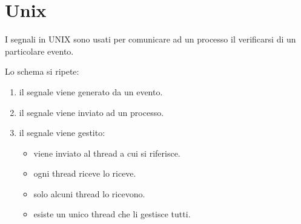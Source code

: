 \begin{figure}[H]
    \centering 
    \qquad
%
    \qquad
%
    \qquad
%
%
    \caption{ }
  \end{figure}

\section{Unix}
I segnali in UNIX sono usati per comunicare ad un processo il verificarsi di un particolare evento. 

Lo schema si ripete:
\begin{enumerate}
  \item il segnale viene generato da un evento.
  \item il segnale viene inviato ad un processo.
  \item il segnale viene gestito: 
        \begin{itemize}
          \item viene inviato al thread a cui si riferisce.
          \item ogni thread riceve lo riceve.
          \item solo alcuni thread lo ricevono.
          \item esiste un unico thread che li gestisce tutti.
        \end{itemize}
\end{enumerate}

